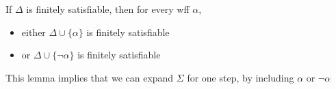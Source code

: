 \begin{lemma}
    \label{lem:CompactnessLemma1}
    If $\Delta$ is finitely satisfiable, then for every wff $\alpha$,
    \begin{itemize}
        \item either $\Delta\cup\{\alpha\}$ is finitely satisfiable
        \item or $\Delta\cup\{\neg\alpha\}$ is finitely satisfiable
    \end{itemize}
\end{lemma}
\begin{remark}
    This lemma implies that we can expand $\Sigma$ for one step, by including $\alpha$ or $\neg\alpha$
\end{remark}

